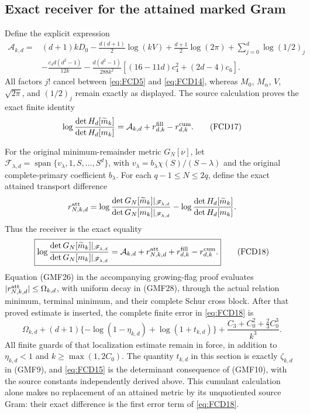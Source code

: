 \subsection{Exact receiver for the attained marked Gram}

Define the explicit expression
\begin{equation}
 \begin{split}
 \mathcal A_{k,d}={}&
 (d+1)kD_0-\frac{d(d+1)}2\log(kV)
 +\frac{d+1}2\log(2\pi)+\sum_{j=0}^d\log(1/2)_j\\
 &-\frac{c_4d(d^2-1)}{12k}
 -\frac{d(d^2-1)}{288k^2}
          [(16-11d)c_4^2+(2d-4)c_6].
 \end{split}
 \tag{FCD16}\label{eq:FCD16}
\end{equation}
All factors \(j!\) cancel between \eqref{eq:FCD5} and
\eqref{eq:FCD14}, whereas \(M_0\), \(M_\alpha\), \(V\),
\(\sqrt{2\pi}\), and \((1/2)_j\) remain exactly as displayed.
The source calculation proves the exact finite identity
\begin{equation}
 \log\frac{\det H_d[\widetilde m_k]}{\det H_d[m_k]}
       =\mathcal A_{k,d}+r_{d,k}^{\rm fill}-r_{d,k}^{\rm cum}.
 \tag{FCD17}\label{eq:FCD17}
\end{equation}

For the original minimum-remainder metric \(G_N[\nu]\), let
\(\mathscr F_{\lambda,d}
 =\operatorname{span}\{v_\lambda,1,S,\ldots,S^d\}\), with
\(v_\lambda=b_\lambda\chi(S)/(S-\lambda)\) and the original
complete-primary coefficient \(b_\lambda\).
For each \(q-1\le N\le2q\), define the exact attained transport difference
\[
 r_{N,k,d}^{\rm att}
  =\log\frac{\det G_N[\widetilde m_k]|_{\mathscr F_{\lambda,d}}}
                  {\det G_N[m_k]|_{\mathscr F_{\lambda,d}}}
    -\log\frac{\det H_d[\widetilde m_k]}{\det H_d[m_k]} .
\]
Thus the receiver is the exact equality
\begin{equation}
 \boxed{\displaystyle
 \log\frac{\det G_N[\widetilde m_k]|_{\mathscr F_{\lambda,d}}}
                  {\det G_N[m_k]|_{\mathscr F_{\lambda,d}}}
  =\mathcal A_{k,d}+r_{N,k,d}^{\rm att}
                          +r_{d,k}^{\rm fill}-r_{d,k}^{\rm cum}.}
 \tag{FCD18}\label{eq:FCD18}
\end{equation}
Equation (GMF26) in the accompanying growing-flag proof evaluates
\(|r_{N,k,d}^{\rm att}|\le\Omega_{k,d}\), with uniform decay in (GMF28),
through the actual relation
minimum, terminal minimum, and their complete Schur cross block.
After that proved estimate is inserted, the complete finite error in
\eqref{eq:FCD18} is
\begin{equation}
 \Omega_{k,d}
 +(d+1)\{-\log(1-\eta_{k,d})+\log(1+t_{k,d})\}
 +\frac{C_3+C_0^2+\tfrac23C_0^3}{k^3}.
 \tag{FCD19}\label{eq:FCD19}
\end{equation}
All finite guards of that localization estimate remain in force, in
addition to \(\eta_{k,d}<1\) and \(k\ge\max(1,2C_0)\).
The quantity \(t_{k,d}\) in this section is exactly \(\zeta_{k,d}\)
in (GMF9), and \eqref{eq:FCD15} is the determinant consequence
of (GMF10), with the source constants independently derived above.
This cumulant calculation alone makes no replacement of an attained
metric by its unquotiented source Gram: their exact difference is
the first error term of \eqref{eq:FCD18}.

